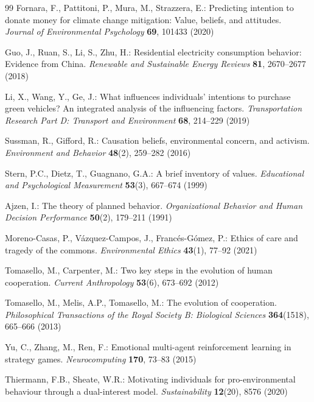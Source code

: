 \documentclass[runningheads]{llncs}
\begin{document}
\begin{thebibliography}{99}
Fornara, F., Pattitoni, P., Mura, M., Strazzera, E.: Predicting intention to donate money for climate change mitigation: Value, beliefs, and attitudes. \textit{Journal of Environmental Psychology} \textbf{69}, 101433 (2020)

Guo, J., Ruan, S., Li, S., Zhu, H.: Residential electricity consumption behavior: Evidence from China. \textit{Renewable and Sustainable Energy Reviews} \textbf{81}, 2670--2677 (2018)

Li, X., Wang, Y., Ge, J.: What influences individuals' intentions to purchase green vehicles? An integrated analysis of the influencing factors. \textit{Transportation Research Part D: Transport and Environment} \textbf{68}, 214--229 (2019)

Sussman, R., Gifford, R.: Causation beliefs, environmental concern, and activism. \textit{Environment and Behavior} \textbf{48}(2), 259--282 (2016)

Stern, P.C., Dietz, T., Guagnano, G.A.: A brief inventory of values. \textit{Educational and Psychological Measurement} \textbf{53}(3), 667--674 (1999)

Ajzen, I.: The theory of planned behavior. \textit{Organizational Behavior and Human Decision Performance} \textbf{50}(2), 179--211 (1991)

Moreno-Casas, P., Vázquez-Campos, J., Francés-Gómez, P.: Ethics of care and tragedy of the commons. \textit{Environmental Ethics} \textbf{43}(1), 77--92 (2021)

Tomasello, M., Carpenter, M.: Two key steps in the evolution of human cooperation. \textit{Current Anthropology} \textbf{53}(6), 673--692 (2012)

Tomasello, M., Melis, A.P., Tomasello, M.: The evolution of cooperation. \textit{Philosophical Transactions of the Royal Society B: Biological Sciences} \textbf{364}(1518), 665--666 (2013)

Yu, C., Zhang, M., Ren, F.: Emotional multi-agent reinforcement learning in strategy games. \textit{Neurocomputing} \textbf{170}, 73--83 (2015)

Thiermann, F.B., Sheate, W.R.: Motivating individuals for pro-environmental behaviour through a dual-interest model. \textit{Sustainability} \textbf{12}(20), 8576 (2020)


\end{thebibliography}
\end{document}
